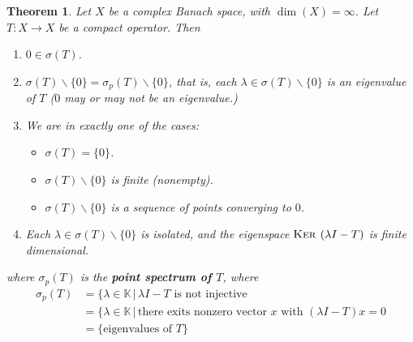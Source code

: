 \documentclass[10pt, oneside, reqno]{amsbook}
\theoremstyle{plain}%
\newtheorem{thm}{Theorem}[section]
\theoremstyle{definition}
\theoremstyle{remark}
\newcommand{\given}{ \, | \,}
\newcommand{\K}{\mathbb{K}}
\renewcommand{\ker}{\textsc{Ker\ }}
\begin{document}
\begin{thm}
Let $X$ be a complex Banach space, with $\dim(X) = \infty$.  Let $T : X \rightarrow X$ be a compact operator.  Then \begin{enumerate}[(1)]
    \item $0 \in \sigma(T)$.  
    \item $\sigma(T) \backslash \{ 0 \} = \sigma_p(T) \backslash \{ 0 \}$, that is, each $\lambda \in \sigma(T) \backslash \{ 0 \}$ is an eigenvalue of $T$ ($0$ may or may not be an eigenvalue.)
    \item We are in exactly one of the cases:
     \begin{itemize}
        \item $\sigma(T) = \{ 0 \}$.
        \item $\sigma(T) \backslash \{ 0 \}$ is finite (nonempty).
        \item $\sigma(T) \backslash \{ 0 \}$ is a sequence of points converging to $0$.  
     \end{itemize}
     \item Each $\lambda \in \sigma(T) \backslash \{ 0 \}$ is isolated, and the eigenspace $\ker(\lambda I - T)$ is finite dimensional.  
\end{enumerate}  
where $\sigma_p(T)$ is the \textbf{point spectrum of $T$}, where \begin{align*}
    \sigma_p(T) &= \{ \lambda \in \K \given \text{$\lambda I - T$ is not injective} \\
                &= \{ \lambda \in \K \given \text{there exits nonzero vector $x$ with $(\lambda I - T)x = 0$} \\
                &= \{ \text{eigenvalues of $T$} \}
\end{align*}
\end{thm}
\end{document}
